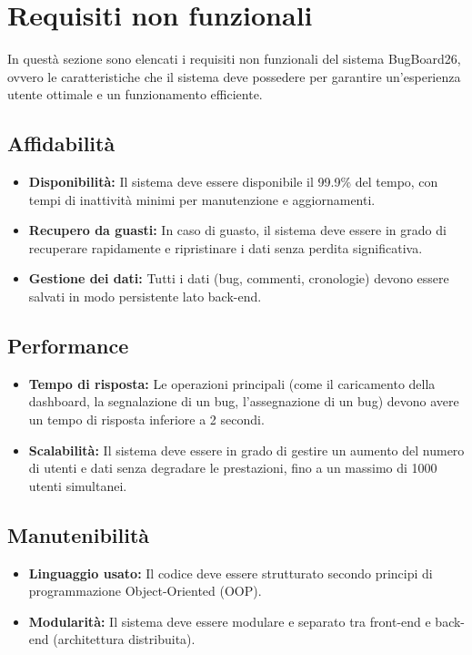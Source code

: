 \section{Requisiti non funzionali}
In questà sezione sono elencati i requisiti non funzionali del sistema BugBoard26, 
ovvero le caratteristiche che il sistema deve possedere per garantire un'esperienza utente ottimale e un funzionamento efficiente.

\subsection{Affidabilità}
\begin{itemize}
    \item \textbf{Disponibilità:} Il sistema deve essere disponibile il 99.9\% del tempo, con tempi di inattività minimi per manutenzione e aggiornamenti.
    \item \textbf{Recupero da guasti:} In caso di guasto, il sistema deve essere in grado di recuperare rapidamente e ripristinare i dati senza perdita significativa.
    \item \textbf{Gestione dei dati:} Tutti i dati (bug, commenti, cronologie) devono essere salvati in modo persistente lato back-end.
\end{itemize}

\subsection{Performance}
\begin{itemize}
    \item \textbf{Tempo di risposta:} Le operazioni principali (come il caricamento della dashboard, la segnalazione di un bug, l'assegnazione di un bug) devono avere un tempo di risposta inferiore a 2 secondi.
    \item \textbf{Scalabilità:} Il sistema deve essere in grado di gestire un aumento del numero di utenti e dati senza degradare le prestazioni, fino a un massimo di 1000 utenti simultanei.
\end{itemize}

\subsection{Manutenibilità}
\begin{itemize}
    \item \textbf{Linguaggio usato:} Il codice deve essere strutturato secondo principi di programmazione Object-Oriented (OOP).
    \item \textbf{Modularità:} Il sistema deve essere modulare e separato tra front-end e back-end (architettura distribuita).
\end{itemize}

